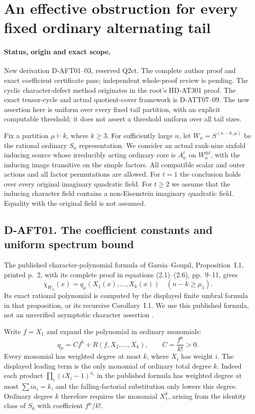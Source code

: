 \section{An effective obstruction for every fixed ordinary alternating tail}
\label{sec:effective-fixed-tail}

\paragraph{Status, origin and exact scope.}
New derivation D-AFT01--03, reserved Q2ct. The complete author
proof and exact coefficient certificate pass; independent
whole-proof review is pending.
The cyclic character-defect method originates in the root's
HD-AT301 proof. The exact tensor-cycle and actual quotient-cover
framework is D-ATT07--09. The new assertion here is uniform over
every fixed tail partition, with an explicit computable threshold;
it does not assert a threshold uniform over all tail sizes.

Fix a partition $\mu\vdash k$, where $k\ge3$. For sufficiently
large $n$, let $W_n=S^{(n-k,\mu)}$ be the rational ordinary
$S_n$ representation. We consider an actual rank-nine sixfold
inducing source whose irreducibly acting ordinary core is $A_n^t$
on $W_n^{\otimes t}$, with the inducing image transitive on the
simple factors. All compatible scalar and outer actions and all
factor permutations are allowed. For $t=1$ the conclusion holds
over every original imaginary quadratic field. For $t\ge2$ we
assume that the inducing character field contains a non-Eisenstein
imaginary quadratic field. Equality with the original field is
not assumed.

\subsection*{D-AFT01. The coefficient constants and uniform spectrum bound}

The published character-polynomial formula of Garsia--Goupil,
Proposition~I.1, printed p.~2, with its complete proof in
equations (2.1)--(2.6), pp.~9--11, gives
\[
 \chi_{W_n}(x)=q_\mu(X_1(x),\ldots,X_k(x))
 \quad(n-k\ge\mu_1).                                  \tag{AFT.1}
\]
Its exact rational polynomial is computed by the displayed
finite umbral formula in that proposition, or its recursive
Corollary~I.1. We use this published formula, not an unverified
asymptotic character assertion \cite{HD:GarsiaGoupil2009}.

Write $f=X_1$ and expand the polynomial in ordinary monomials:
\[
 q_\mu=Cf^k+R(f,X_2,\ldots,X_k),\qquad
 C=\frac{f^\mu}{k!}>0.                                 \tag{AFT.2}
\]
Every monomial has weighted degree at most $k$, where $X_i$
has weight $i$. The displayed leading term is the only monomial
of ordinary total degree $k$. Indeed each product
$\prod_i(iX_i-1)^{a_i}$ in the published formula has weighted
degree at most $\sum ia_i=k$, and the falling-factorial
substitution only lowers this degree. Ordinary degree $k$
therefore requires the monomial $X_1^k$, arising from the
identity class of $S_k$ with coefficient $f^\mu/k!$.

